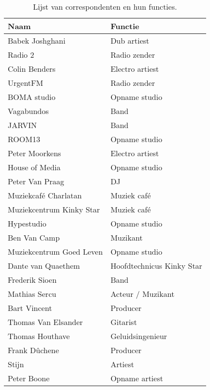 \begin{table}[h!]
  \centering
  \begin{tabular}{|l|l|}
    \hline
    \textbf{Naam} & \textbf{Functie} \\
    \hline
    Babek Joshghani & Dub artiest \\
    \hline
    Radio 2 & Radio zender \\
    \hline
    Colin Benders & Electro artiest \\
    \hline
    UrgentFM & Radio zender \\
    \hline
    BOMA studio & Opname studio \\
    \hline
    Vagabundos & Band \\
    \hline
    JARVIN & Band \\
    \hline
    ROOM13 & Opname studio \\
    \hline
    Peter Moorkens & Electro artiest \\
    \hline
    House of Media & Opname studio \\
    \hline
    Peter Van Praag & DJ \\
    \hline
    Muziekcafé Charlatan & Muziek café \\
    \hline
    Muziekcentrum Kinky Star & Muziek café \\
    \hline
    Hypestudio & Opname studio \\
    \hline
    Ben Van Camp & Muzikant \\
    \hline
    Muziekcentrum Goed Leven & Opname studio \\
    \hline
    Dante van Quaethem & Hoofdtechnicus Kinky Star \\
    \hline
    Frederik Sioen & Band \\
    \hline
    Mathias Sercu & Acteur / Muzikant \\
    \hline
    Bart Vincent & Producer \\
    \hline
    Thomas Van Elsander & Gitarist  \\
    \hline
    Thomas Houthave & Geluidsingenieur \\
    \hline
    Frank Dûchene & Producer \\
    \hline
    Stijn & Artiest \\
    \hline
    Peter Boone & Opname artiest \\
    \hline
  \end{tabular}
  \caption{Lijst van correspondenten en hun functies.}
  \label{table:correspondenten}
\end{table}

